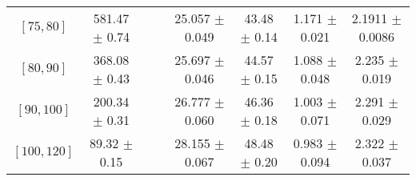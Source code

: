 \begin{tabular}{c||c|c|c|c|c|c|c}
$[75, 80]$ & 581.47 $\pm$ 0.74 &  &  & 25.057 $\pm$ 0.049 & 43.48 $\pm$ 0.14 & 1.171 $\pm$ 0.021 & 2.1911 $\pm$ 0.0086\\
$[80, 90]$ & 368.08 $\pm$ 0.43 &  &  & 25.697 $\pm$ 0.046 & 44.57 $\pm$ 0.15 & 1.088 $\pm$ 0.048 & 2.235 $\pm$ 0.019\\
$[90, 100]$ & 200.34 $\pm$ 0.31 &  &  & 26.777 $\pm$ 0.060 & 46.36 $\pm$ 0.18 & 1.003 $\pm$ 0.071 & 2.291 $\pm$ 0.029\\
$[100, 120]$ & 89.32 $\pm$ 0.15 &  &  & 28.155 $\pm$ 0.067 & 48.48 $\pm$ 0.20 & 0.983 $\pm$ 0.094 & 2.322 $\pm$ 0.037\\
\end{tabular}
